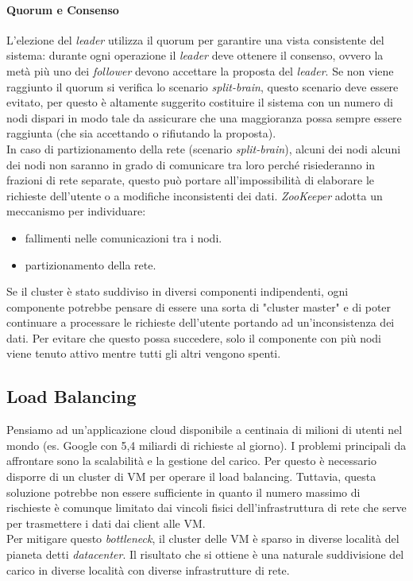 \documentclass{article}
\begin{document}
\paragraph{Quorum e Consenso}
L'elezione del \textit{leader} utilizza il quorum per garantire una vista consistente del sistema: durante ogni operazione il \textit{leader} deve ottenere il consenso, ovvero la metà più uno dei \textit{follower} devono accettare la proposta del \textit{leader}. Se non viene raggiunto il quorum si verifica lo scenario \textit{split-brain}, questo scenario deve essere evitato, per questo è altamente suggerito costituire il sistema con un numero di nodi dispari in modo tale da assicurare che una maggioranza possa sempre essere raggiunta (che sia accettando o rifiutando la proposta).\\
In caso di partizionamento della rete (scenario \textit{split-brain}), alcuni dei nodi alcuni dei nodi non saranno in grado di comunicare tra loro perché risiederanno in frazioni di rete separate, questo può portare all'impossibilità di elaborare le richieste dell'utente o a modifiche inconsistenti dei dati. \textit{ZooKeeper} adotta un meccanismo per individuare:
\begin{itemize}
    \item fallimenti nelle comunicazioni tra i nodi.
    \item partizionamento della rete.
\end{itemize}
Se il cluster è stato suddiviso in diversi componenti indipendenti, ogni componente potrebbe pensare di essere una sorta di "cluster master" e di poter continuare a processare le richieste dell'utente portando ad un'inconsistenza dei dati. Per evitare che questo possa succedere, solo il componente con più nodi viene tenuto attivo mentre tutti gli altri vengono spenti.

\subsection{Load Balancing}
Pensiamo ad un'applicazione cloud disponibile a centinaia di milioni di utenti nel mondo (es. Google con 5,4 miliardi di richieste al giorno). I problemi principali da affrontare sono la scalabilità e la gestione del carico. Per questo è necessario disporre di un cluster di VM per operare il load balancing. Tuttavia, questa soluzione potrebbe non essere sufficiente in quanto il numero massimo di rischieste è comunque limitato dai vincoli fisici dell'infrastruttura di rete che serve per trasmettere i dati dai client alle VM.\\
Per mitigare questo \textit{bottleneck}, il cluster delle VM è sparso in diverse località del pianeta detti \textit{datacenter}. Il risultato che si ottiene è una naturale suddivisione del carico in diverse località con diverse infrastrutture di rete.
\end{document}

